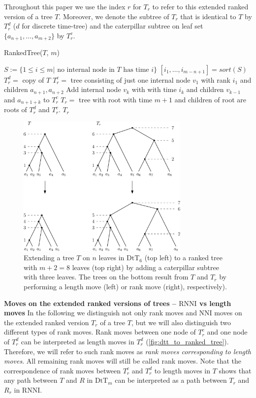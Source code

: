 \documentclass[11pt]{amsart}
\newcommand{\rnni}{\mathrm{RNNI}}
\newcommand{\nni}{\mathrm{NNI}}
\newcommand{\dtt}{\mathrm{DtT}}
\newcommand{\summary}[1]{\textbf{#1}} %
\begin{document}
Throughout this paper we use the index $r$ for $T_r$ to refer to this extended ranked version of a tree $T$.
Moreover, we denote the subtree of $T_r$ that is identical to $T$ by $T_r^d$ ($d$ for discrete time-tree) and the caterpillar subtree on leaf set $\{a_{n+1}, \ldots, a_{m+2}\}$ by $T_r^c$.

\begin{algorithm}[ht]
	\caption{RankedTree($T$, $m$)}
	\label{alg:ranked_tree}
	\begin{algorithmic}[1]
		\STATE $S:= \{1 \leq i \leq m | \text{ no internal node in } T \text{ has time } i\}$
		\STATE $[i_1, \ldots, i_{m-n+1}] = sort(S)$
		\STATE $T_r^d =$ copy of $T$
		\STATE $T_r^c =$ tree consisting of just one internal node $v_1$ with rank $i_1$ and children $a_{n+1}, a_{n+2}$
			\STATE Add internal node $v_k$ with with time $i_k$ and children $v_{k-1}$ and $a_{n+1+k}$ to $T_r^c$
		\STATE $T_r = $ tree with root with time $m+1$ and children of root are roots of $T_r^d$ and $T_r^c$.
		\ENDFOR
		\RETURN $T_r$
	\end{algorithmic}
\end{algorithm}

\begin{figure}[ht]
	\includegraphics[width=0.75\textwidth]{dtt_to_ranked_tree.eps}
	\caption{Extending a tree $T$ on $n$ leaves in $\dtt_6$ (top left) to a ranked tree with $m+2=8$ leaves (top right) by adding a caterpillar subtree with three leaves.
	The trees on the bottom result from $T$ and $T_r$ by performing a length move (left) or rank move (right), respectively).}
	\label{fig:dtt_to_ranked_tree}
\end{figure}

\summary{Moves on the extended ranked versions of trees -- $\rnni$ vs length moves}
In the following we distinguish not only rank moves and $\nni$ moves on the extended ranked version $T_r$ of a tree $T$, but we will also distinguish two different types of rank moves.
Rank moves between one node of $T_r^c$ and one node of $T_r^d$ can be interpreted as length moves in $T_r^d$ (\autoref{fig:dtt_to_ranked_tree}).
Therefore, we will refer to such rank moves as \emph{rank moves corresponding to length moves}.
All remaining rank moves will still be called rank moves.
Note that the correspondence of rank moves between $T_r^c$ and $T_r^d$ to length moves in $T$ shows that any path between $T$ and $R$ in $\dtt_m$ can be interpreted as a path between $T_r$ and $R_r$ in $\rnni$.
\end{document}
